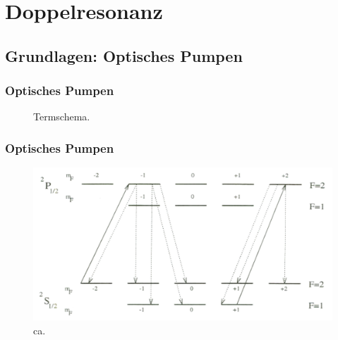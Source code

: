 
\section{Doppelresonanz}
\subsection{Grundlagen: Optisches Pumpen}


\begin{frame}
\frametitle{Optisches Pumpen}

  \begin{figure}
    \centering
    \def\svgwidth{0.45\textwidth}
    
    \caption{Termschema.}
\end{figure}
\end{frame}




\begin{frame}
\frametitle{Optisches Pumpen}

\begin{figure}[H]
\begin{center}
  \includegraphics[width=\textwidth]{../img/optPumpen.png}
  \caption{ca.}
\end{center}
\end{figure}

\end{frame}

